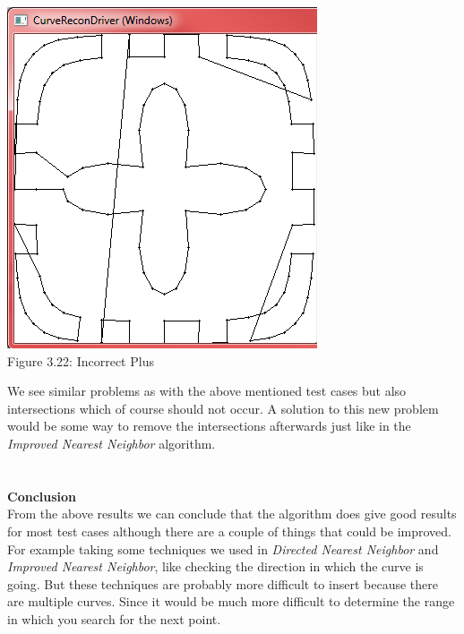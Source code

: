           \begin{center}
            \includegraphics[scale = 0.7]{4UpToFiveSort/utfsPlus128.png}\\
            Figure 3.22: Incorrect Plus
            \label{fig:utfs incorrect plus}
          \end{center}
    We see similar problems as with the above mentioned test cases but also intersections which of course should not occur. A solution to this new problem would be some way to remove the intersections afterwards just like in the \textit{Improved Nearest Neighbor} algorithm.\\ \\ \\
   \textbf{Conclusion}\\
   From the above results we can conclude that the algorithm does give good results for most test cases although there are a couple of things that could be improved. For example taking some techniques we used in \textit{Directed Nearest Neighbor} and \textit{Improved Nearest Neighbor}, like checking the direction in which the curve is going. But these techniques are probably more difficult to insert because there are multiple curves. Since it would be much more difficult to determine the range in which you search for the next point.

